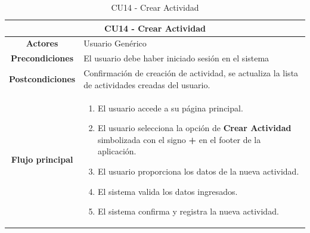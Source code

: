 \begin{table}[h]
    \centering
    \begin{tabular}{|c|p{10cm}|}
        \hline
        \multicolumn{2}{|c|}{\textbf{CU14 - Crear Actividad}}                                                                                                          \\
        \hline
        \textbf{Actores}         & Usuario Genérico                                                                                                                    \\
        \hline
        \textbf{Precondiciones}  & El usuario debe haber iniciado sesión en el sistema                                                                                 \\
        \hline
        \textbf{Postcondiciones} & Confirmación de creación de actividad, se actualiza la lista de actividades creadas del usuario.                                    \\
        \hline
        \textbf{Flujo principal} & \begin{enumerate}
                                       \item El usuario accede a su página principal.
                                       \item El usuario selecciona la opción de \textbf{Crear Actividad} simbolizada con el signo \textbf{+} en el footer de la aplicación.
                                       \item El usuario proporciona los datos de la nueva actividad.
                                       \item El sistema valida los datos ingresados.
                                       \item El sistema confirma y registra la nueva actividad.
                                   \end{enumerate} \\
        \hline
    \end{tabular}
    \caption{CU14 - Crear Actividad }
\end{table}


